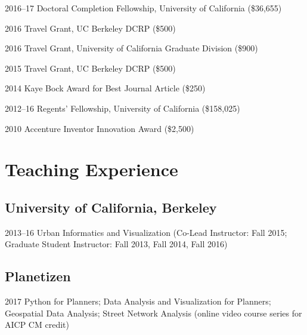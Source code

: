 \documentclass{academiccv}
\begin{document}
\begin{tablist}
	
\item[2016--17] \tab Doctoral Completion Fellowship, University of California (\$36,655)

\item[2016]     \tab Travel Grant, UC Berkeley DCRP (\$500)

\item[2016]     \tab Travel Grant, University of California Graduate Division (\$900)

\item[2015]     \tab Travel Grant, UC Berkeley DCRP (\$500)

\item[2014]     \tab Kaye Bock Award for Best Journal Article (\$250)

\item[2012--16] \tab Regents' Fellowship, University of California (\$158,025)

\item[2010]     \tab Accenture Inventor Innovation Award (\$2,500)

\end{tablist}



\section*{Teaching Experience}

\subsection*{University of California, Berkeley}

\begin{tablist}
	
\item[2013--16]	\tab Urban Informatics and Visualization (Co-Lead Instructor: Fall 2015; Graduate Student Instructor: Fall 2013, Fall 2014, Fall 2016)
	
\end{tablist}

\subsection*{Planetizen}

\begin{tablist}

\item[2017]		\tab Python for Planners; Data Analysis and Visualization for Planners; Geospatial Data Analysis; Street Network Analysis (online video course series for AICP CM credit)

\end{tablist}
\end{document}

